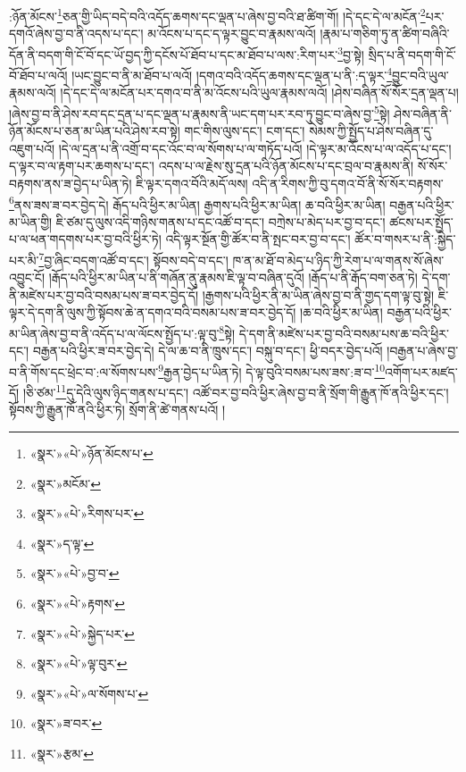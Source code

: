 :ཉོན་མོངས་\footnote{«སྣར་»«པེ་»ཉོན་མོངས་པ་}ཅན་གྱི་ཡིད་བདེ་བའི་འདོད་ཆགས་དང་ལྡན་པ་ཞེས་བྱ་བའི་ཐ་ཚིག་གོ། །དེ་དང་དེ་ལ་མངོན་\footnote{«སྣར་»མངོམ་}པར་དགའོ་ཞེས་བྱ་བ་ནི་འདས་པ་དང་། མ་འོངས་པ་དང་ད་ལྟར་བྱུང་བ་རྣམས་ལའོ། །རྣམ་པ་གཅིག་ཏུ་ན་ཚིག་བཞིའི་དོན་ནི་བདག་གི་ངོ་བོ་དང་ཡོ་བྱད་ཀྱི་དངོས་པོ་ཐོབ་པ་དང་མ་ཐོབ་པ་ལས་:རིག་པར་\footnote{«སྣར་»«པེ་»རིགས་པར་}བྱ་སྟེ། སྲིད་པ་ནི་བདག་གི་ངོ་བོ་ཐོབ་པ་ལའོ། །ཡང་བྱུང་བ་ནི་མ་ཐོབ་པ་ལའོ། །དགའ་བའི་འདོད་ཆགས་དང་ལྡན་པ་ནི་:ད་ལྟར་\footnote{«སྣར་»ད་ལྟ་}བྱུང་བའི་ཡུལ་རྣམས་ལའོ། །དེ་དང་དེ་ལ་མངོན་པར་དགའ་བ་ནི་མ་འོངས་པའི་ཡུལ་རྣམས་ལའོ། །ཤེས་བཞིན་སོ་སོར་དྲན་ལྡན་པ། །ཞེས་བྱ་བ་ནི་ཤེས་རབ་དང་དྲན་པ་དང་ལྡན་པ་རྣམས་ནི་ཡང་དག་པར་རབ་ཏུ་བྱུང་བ་ཞེས་བྱ་\footnote{«སྣར་»«པེ་»བྱ་བ་}སྟེ། ཤེས་བཞིན་ནི་ཉོན་མོངས་པ་ཅན་མ་ཡིན་པའི་ཤེས་རབ་སྟེ། གང་གིས་ལུས་དང་། ངག་དང་། སེམས་ཀྱི་སྤྱོད་པ་ཤེས་བཞིན་དུ་འཇུག་པའོ། །དེ་ལ་དྲན་པ་ནི་འགྲོ་བ་དང་འོང་བ་ལ་སོགས་པ་ལ་གཏོད་པའོ། །དེ་ལྟར་མ་འོངས་པ་ལ་འདོད་པ་དང་། ད་ལྟར་བ་ལ་རྟག་པར་ཆགས་པ་དང་། འདས་པ་ལ་རྗེས་སུ་དྲན་པའི་ཉོན་མོངས་པ་དང་བྲལ་བ་རྣམས་ནི། སོ་སོར་བརྟགས་ནས་ཟ་བྱེད་པ་ཡིན་ཏེ། ཇི་ལྟར་དགའ་བོའི་མདོ་ལས། འདི་ན་རིགས་ཀྱི་བུ་དགའ་བོ་ནི་སོ་སོར་བརྟགས་\footnote{«སྣར་»«པེ་»རྟགས་}ནས་ཟས་ཟ་བར་བྱེད་དེ། རྒོད་པའི་ཕྱིར་མ་ཡིན། རྒྱགས་པའི་ཕྱིར་མ་ཡིན། ཆ་བའི་ཕྱིར་མ་ཡིན། བརྒྱན་པའི་ཕྱིར་མ་ཡིན་གྱི། ཇི་ཙམ་དུ་ལུས་འདི་གཉིས་གནས་པ་དང་འཚོ་བ་དང་། བཀྲེས་པ་མེད་པར་བྱ་བ་དང་། ཚངས་པར་སྤྱོད་པ་ལ་ཕན་གདགས་པར་བྱ་བའི་ཕྱིར་ཏེ། འདི་ལྟར་སྔོན་གྱི་ཚོར་བ་ནི་སྤང་བར་བྱ་བ་དང་། ཚོར་བ་གསར་པ་ནི་:སྐྱེད་པར་མི་\footnote{«སྣར་»«པེ་»སྐྱེད་པར་}བྱ་ཞིང་བདག་འཚོ་བ་དང་། སྟོབས་བདེ་བ་དང་། ཁ་ན་མ་ཐོ་བ་མེད་པ་ཉིད་ཀྱི་རེག་པ་ལ་གནས་སོ་ཞེས་འབྱུང་ངོ། །རྒོད་པའི་ཕྱིར་མ་ཡིན་པ་ནི་གཞོན་ནུ་རྣམས་ཇི་ལྟ་བ་བཞིན་དུའོ། །རྒོད་པ་ནི་རྒོད་བག་ཅན་ཏེ། དེ་དག་ནི་མཛེས་པར་བྱ་བའི་བསམ་པས་ཟ་བར་བྱེད་དོ། །རྒྱགས་པའི་ཕྱིར་ནི་མ་ཡིན་ཞེས་བྱ་བ་ནི་གྱད་དག་ལྟ་བུ་སྟེ། ཇི་ལྟར་དེ་དག་ནི་ལུས་ཀྱི་སྟོབས་ཆེ་ན་དགའ་བའི་བསམ་པས་ཟ་བར་བྱེད་དོ། །ཆ་བའི་ཕྱིར་མ་ཡིན། བརྒྱན་པའི་ཕྱིར་མ་ཡིན་ཞེས་བྱ་བ་ནི་འདོད་པ་ལ་ལོངས་སྤྱོད་པ་:ལྟ་བུ་\footnote{«སྣར་»«པེ་»ལྟ་བུར་}སྟེ། དེ་དག་ནི་མཛེས་པར་བྱ་བའི་བསམ་པས་ཆ་བའི་ཕྱིར་དང་། བརྒྱན་པའི་ཕྱིར་ཟ་བར་བྱེད་དེ། དེ་ལ་ཆ་བ་ནི་ཁྲུས་དང་། བསྐུ་བ་དང་། ཕྱི་བདར་བྱེད་པའོ། །བརྒྱན་པ་ཞེས་བྱ་བ་ནི་གོས་དང་ཕྲེང་བ་:ལ་སོགས་པས་\footnote{«སྣར་»«པེ་»ལ་སོགས་པ་}རྒྱན་བྱེད་པ་ཡིན་ཏེ། དེ་ལྟ་བུའི་བསམ་པས་ཟས་:ཟ་བ་\footnote{«སྣར་»ཟ་བར་}འགོག་པར་མཛད་དོ། །ཅི་ཙམ་\footnote{«སྣར་»རྩམ་}དུ་དེའི་ལུས་ཉིད་གནས་པ་དང་། འཚོ་བར་བྱ་བའི་ཕྱིར་ཞེས་བྱ་བ་ནི་སྲོག་གི་རྒྱུན་ཁོ་ནའི་ཕྱིར་དང་། སྟོབས་ཀྱི་རྒྱུན་ཁོ་ནའི་ཕྱིར་ཏེ། སྲོག་ནི་ཚེ་གནས་པའོ། །
